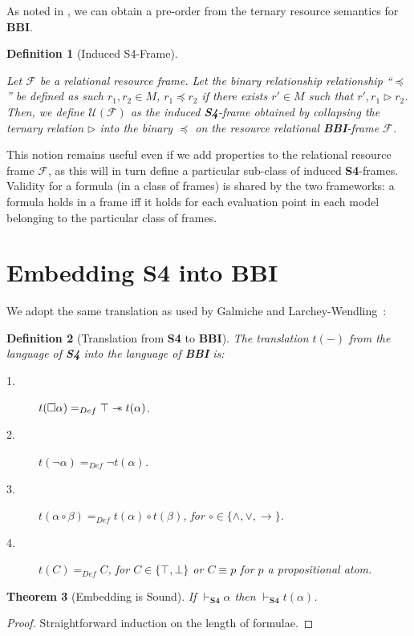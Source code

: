\documentclass[a4paper]{article}
\newtheorem{theorem}{Theorem}[section]
\newtheorem{definition}[theorem]{Definition}
\newcommand\magicwand{\mathrel{-\mkern-6mu*}}
\newcommand{\BBI}{\textbf{BBI}\xspace}
\newcommand{\SFour}{\textbf{S4}\xspace}
\begin{document}
As noted in \cite{galmiche_expressivity_2006}, we can obtain a pre-order from the ternary resource semantics for \BBI. 

\begin{definition}[Induced S4-Frame]\label{induced_frame}

Let $\mathcal{F}$ be a relational resource frame. Let the binary relationship relationship ``$\preceq$'' be defined as such $r_1, r_2 \in M$, $r_1\preceq r_2$ if there exists $r'\in M$ such that $r',r_1 \triangleright r_2$. Then, we define $\mathcal{U}(\mathcal{F})$ as the induced \SFour-frame obtained by collapsing the ternary relation $\triangleright$ into the binary $\preceq$ on the resource relational \BBI-frame $\mathcal{F}$. 
\end{definition}

This notion remains useful even if we add properties to the relational resource frame $\mathcal{F}$, as this will in turn define a particular sub-class of induced \SFour-frames. Validity for a formula (in a class of frames) is shared by the two frameworks: a formula holds in a frame iff it holds for each evaluation point in each model belonging to the particular class of frames.


\section{Embedding \SFour into \BBI}
\label{Sec:embedding}

We adopt the same translation as used by
Galmiche and Larchey-Wendling~\cite{galmiche_expressivity_2006}:

\begin{definition}[Translation from \SFour to \BBI]\label{Def:emb}
The translation $t(-)$ from the language of \SFour into the language of \BBI is:
\begin{description}
    \item[1.] $t(\Box \alpha) =_{Def}\top \magicwand t(\alpha) $.
    \item[2.] $t(\neg \alpha) =_{Def}\neg t(\alpha) $.
    \item[3.] $t(\alpha \circ \beta)=_{Def}t(\alpha) \circ t(\beta) $, for $\circ \in \{\land, \lor, \rightarrow\}$.
    \item[4.] $t(C)=_{Def}C$, for $C \in \{\top, \bot\}$ or $C \equiv p$ for $p$ a propositional atom.
\end{description}
\end{definition}

\begin{theorem}[Embedding is Sound]
\label{Theorem:sound}
If $\vdash_{\SFour}\alpha$ then $\vdash_{\SFour}t(\alpha)$.
\end{theorem}
\begin{proof}
Straightforward induction on the length of formulae.
\end{proof} 
\end{document}
